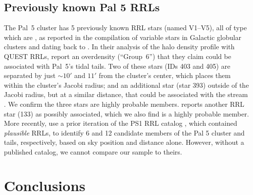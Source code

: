 \documentclass[twocolumn]{aastex63}
\newcommand{\sa}[1]{{\color{teal} SP: #1}}
\begin{document}


\subsection{Previously known Pal 5 RRLs}

The Pal~5 cluster has 5 previously known RRL stars (named V1--V5), all of type which are \typec, as reported in the \citet{Clement:2001} compilation of variable stars in Galactic globular clusters and dating back to \citet{Kinman:1962}.
In their analysis of the halo density profile with QUEST RRLs, \citet{Vivas:2006} report an overdensity (``Group~6'') that they claim could be associated with Pal~5's tidal tails.
Two of these stars (IDs 403 and 405) are separated by just $\sim10'$ and $11'$ from the cluster's center, which places them within the cluster's Jacobi radius; and an additional star (star 393) outside of the Jacobi radius, but at a similar distance, that could be associated with the stream \citep{Vivas:2006}. We confirm the three stars are highly probable members. \citet{Wu:2005} reports another RRL star (133) as possibly associated, which we also find is a highly probable member. More recently, \citet{Ibata:2017} use a prior iteration of the PS1 RRL catalog \citep{Hernitschek:2016}, which contained \emph{plausible} RRLs, to identify 6 and 12 candidate members of the Pal 5 cluster and tails, respectively, based on sky position and distance alone. However, without a published catalog, we cannot compare our sample to theirs.



\section{Conclusions} \label{sec:conclusions}
\end{document}
